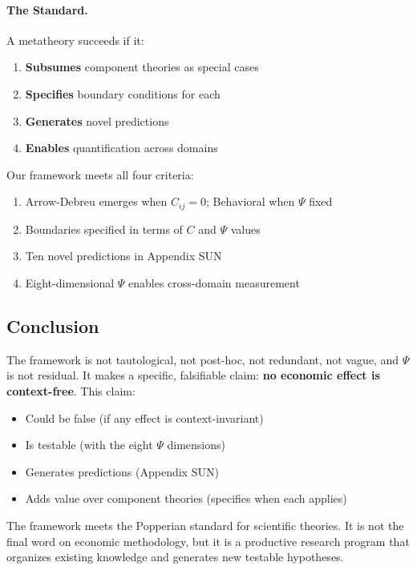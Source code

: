 \paragraph{The Standard.}
A metatheory succeeds if it:
\begin{enumerate}
    \item \textbf{Subsumes} component theories as special cases
    \item \textbf{Specifies} boundary conditions for each
    \item \textbf{Generates} novel predictions
    \item \textbf{Enables} quantification across domains
\end{enumerate}

Our framework meets all four criteria:
\begin{enumerate}
    \item Arrow-Debreu emerges when $C_{ij} = 0$; Behavioral when $\Psi$ fixed
    \item Boundaries specified in terms of $C$ and $\Psi$ values
    \item Ten novel predictions in Appendix SUN
    \item Eight-dimensional $\Psi$ enables cross-domain measurement
\end{enumerate}

\subsection{Conclusion}

The framework is not tautological, not post-hoc, not redundant, not vague, and $\Psi$ is not residual. It makes a specific, falsifiable claim: \textbf{no economic effect is context-free}. This claim:

\begin{itemize}
    \item Could be false (if any effect is context-invariant)
    \item Is testable (with the eight $\Psi$ dimensions)
    \item Generates predictions (Appendix SUN)
    \item Adds value over component theories (specifies when each applies)
\end{itemize}

The framework meets the Popperian standard for scientific theories. It is not the final word on economic methodology, but it is a productive research program that organizes existing knowledge and generates new testable hypotheses.

